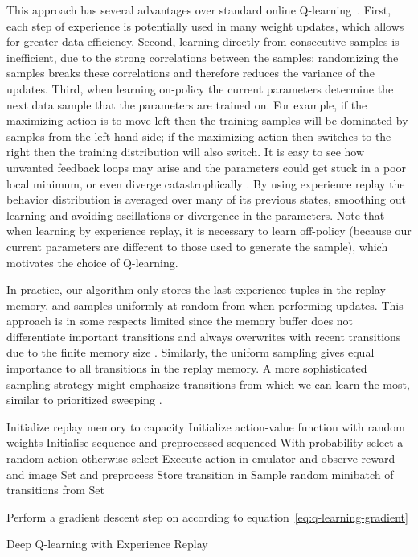 \documentclass{article} \usepackage{nips13submit_e,times}
\begin{document}
This approach has several advantages over standard online Q-learning~\cite{sutton:book}. First, each step of experience is potentially used in many weight updates, which allows for greater data efficiency. Second, learning directly from consecutive samples is inefficient, due to the strong correlations between the samples; randomizing the samples breaks these correlations and therefore reduces the variance of the updates. Third, when learning on-policy the current parameters determine the next data sample that the parameters are trained on. For example, if the maximizing action is to move left then the training samples will be dominated by samples from the left-hand side; if the maximizing action then switches to the right then the training distribution will also switch. It is easy to see how unwanted feedback loops may arise and the parameters could get stuck in a poor local minimum, or even diverge catastrophically \cite{tsitsiklis:td-convergence}. By using experience replay the behavior distribution is averaged over many of its previous states, smoothing out learning and avoiding oscillations or divergence in the parameters. Note that when learning by experience replay, it is necessary to learn off-policy (because our current parameters are different to those used to generate the sample), which motivates the choice of Q-learning.

In practice, our algorithm only stores the last  experience tuples in the replay memory, and samples uniformly at random from  when performing updates. This approach is in some respects limited since the memory buffer does not differentiate important transitions and always overwrites with recent transitions due to the finite memory size . Similarly, the uniform sampling gives equal importance to all transitions in the replay memory. A more sophisticated sampling strategy might emphasize transitions from which we can learn the most, similar to prioritized sweeping \cite{moore:prioritized}.  



\begin{algorithm}[t]
\begin{algorithmic}
\State Initialize replay memory  to capacity 
\State Initialize action-value function  with random weights
\State Initialise sequence  and preprocessed sequenced 
\For {}
	\State With probability  select a random action 
	\State otherwise select 
	\State Execute action  in emulator and observe reward  and image 
	\State Set  and preprocess 
	\State Store transition  in 
\State Sample random minibatch of transitions  from 
	\State Set
	
	\State Perform a gradient descent step on  according to equation~\ref{eq:q-learning-gradient}
\EndFor
\EndFor
\end{algorithmic}
\caption{Deep Q-learning with Experience Replay}
\label{alg}
\end{algorithm}
\end{document}
